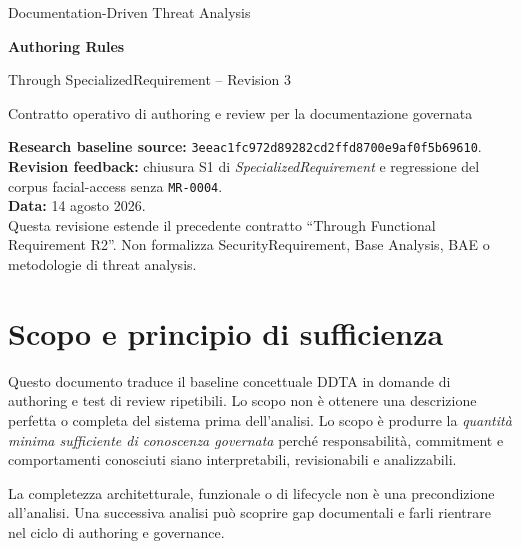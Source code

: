 \documentclass[11pt,a4paper]{article}
\newcommand{\SR}{\textit{SpecializedRequirement}}
\newcommand{\artifact}[1]{\nolinkurl{#1}}
\begin{document}
\begin{titlepage}
\centering\vspace*{2.2cm}
{\Large Documentation-Driven Threat Analysis\par}\vspace{.8cm}
{\Huge\bfseries Authoring Rules\par}\vspace{.25cm}
{\LARGE Through SpecializedRequirement -- Revision 3\par}\vspace{1cm}
{\large Contratto operativo di authoring e review per la documentazione governata\par}
\vfill
\begin{minipage}{.84\textwidth}\small
\textbf{Research baseline source:} \artifact{3eeac1fc972d89282cd2ffd8700e9af0f5b69610}.\\
\textbf{Revision feedback:} chiusura S1 di \SR{} e regressione del corpus facial-access senza \texttt{MR-0004}.\\
\textbf{Data:} 14 agosto 2026.\\[.5em]
Questa revisione estende il precedente contratto ``Through Functional Requirement R2''. Non formalizza SecurityRequirement, Base Analysis, BAE o metodologie di threat analysis.
\end{minipage}
\vfill
\end{titlepage}
\tableofcontents\newpage

\section{Scopo e principio di sufficienza}
Questo documento traduce il baseline concettuale DDTA in domande di authoring e test di review ripetibili. Lo scopo non è ottenere una descrizione perfetta o completa del sistema prima dell'analisi. Lo scopo è produrre la \emph{quantità minima sufficiente di conoscenza governata} perché responsabilità, commitment e comportamenti conosciuti siano interpretabili, revisionabili e analizzabili.

\begin{closedbox}
La completezza architetturale, funzionale o di lifecycle non è una precondizione all'analisi. Una successiva analisi può scoprire gap documentali e farli rientrare nel ciclo di authoring e governance.
\end{closedbox}
\end{document}
